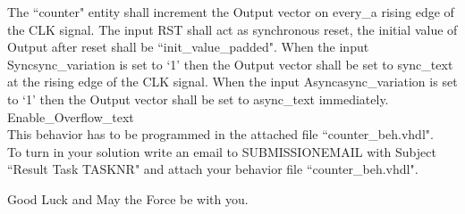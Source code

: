 \documentclass[a4paper,12pt]{article}
\begin{document}
The ``counter" entity shall increment the Output vector on {{every_a}} rising edge of the CLK signal. The input RST shall act as synchronous reset, the initial value of Output after reset shall be ``{{init_value_padded}}". When the input Sync{{sync_variation}} is set to `1' then the Output vector shall be set to {{sync_text}} at the rising edge of the CLK signal. When the input Async{{async_variation}} is set to `1' then the Output vector shall be set to {{async_text}} immediately. {{Enable_Overflow_text}} \\

This behavior has to be programmed in the attached file ``counter\_beh.vhdl".\\


To turn in your solution write an email to {{SUBMISSIONEMAIL}} with Subject ``Result Task {{TASKNR}}" and attach your behavior file ``counter\_beh.vhdl".

\vspace{0.7cm}
Good Luck and May the Force be with you.
\end{document}

